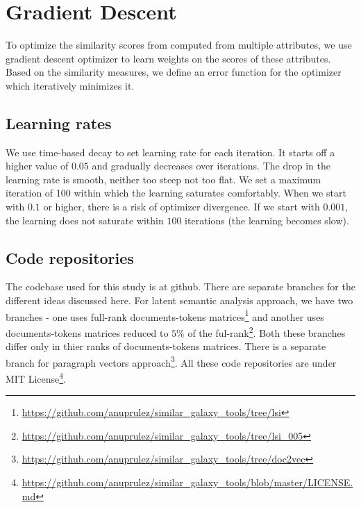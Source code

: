 \section{Gradient Descent}
To optimize the similarity scores from computed from multiple attributes, we use gradient descent optimizer to learn weights on the scores of these attributes. Based on the similarity measures, we define an error function for the optimizer which iteratively minimizes it.

\subsection{Learning rates}
We use time-based decay to set learning rate for each iteration. It starts off a higher value of $0.05$ and gradually decreases over iterations. The drop in the learning rate is smooth, neither too steep not too flat. We set a maximum iteration of 100 within which the learning saturates comfortably. When we start with $0.1$ or higher, there is a risk of optimizer divergence. If we start with $0.001$, the learning does not saturate within $100$ iterations (the learning becomes slow). 

\subsection{Code repositories}
The codebase used for this study is at github. There are separate branches for the different ideas discussed here. For latent semantic analysis approach, we have two branches - one uses full-rank documents-tokens matrices\footnote{\url{https://github.com/anuprulez/similar_galaxy_tools/tree/lsi}} and another uses documents-tokens matrices reduced to $5\%$ of the ful-rank\footnote{\url{https://github.com/anuprulez/similar_galaxy_tools/tree/lsi_005}}. Both these branches differ only in thier ranks of documents-tokens matrices. There is a separate branch for paragraph vectors approach\footnote{\url{https://github.com/anuprulez/similar_galaxy_tools/tree/doc2vec}}. All these code repositories are under MIT License\footnote{\url{https://github.com/anuprulez/similar_galaxy_tools/blob/master/LICENSE.md}}.
